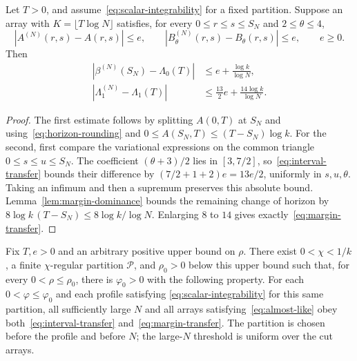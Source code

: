 \begin{lemma}\label{lem:margin-transfer}
Let $T>0$, and assume~\eqref{eq:scalar-integrability} for a fixed
partition. Suppose an array with $K=\lfloor T\log N\rfloor$ satisfies,
for every $0\le r\le s\le S_N$ and $2\le\theta\le4$,
\begin{equation}\label{eq:interval-transfer}
 |A^{(N)}(r,s)-A(r,s)|\le e,\qquad
 |B^{(N)}_\theta(r,s)-B_\theta(r,s)|\le e,
 \qquad e\ge0.
\end{equation}
Then
\begin{align}\label{eq:margin-transfer}
 |\beta^{(N)}(S_N)-\Lambda_0(T)|&\le e+\frac{\log k}{\log N},\nonumber\\
 |\Lambda_1^{(N)}-\Lambda_1(T)|&\le\frac{13}{2}e+
                                          \frac{14\log k}{\log N}.
\end{align}
\end{lemma}

\begin{proof}
The first estimate follows by splitting $A(0,T)$ at $S_N$ and
using~\eqref{eq:horizon-rounding} and
$0\le A(S_N,T)\le(T-S_N)\log k$. For the second, first compare
the variational expressions on the common triangle
$0\le s\le u\le S_N$. The coefficient $(\theta+3)/2$ lies in
$[3,7/2]$, so~\eqref{eq:interval-transfer} bounds their difference
by $(7/2+1+2)e=13e/2$, uniformly in $s,u,\theta$. Taking an
infimum and then a supremum preserves this absolute bound.
Lemma~\ref{lem:margin-dominance} bounds the remaining change of
horizon by $8\log k\,(T-S_N)\le8\log k/\log N$. Enlarging $8$
to $14$ gives exactly~\eqref{eq:margin-transfer}.
\end{proof}

\begin{proposition}\label{prop:profile-transfer}
Fix $T,e>0$ and an arbitrary positive upper bound on $\rho$.
There exist $0<\chi<1/k$, a finite $\chi$-regular partition
$\mathcal P$, and $\rho_0>0$ below this upper bound such that, for
every $0<\rho\le\rho_0$, there is $\varphi_0>0$ with the following
property. For each $0<\varphi\le\varphi_0$ and each profile satisfying
\eqref{eq:scalar-integrability} for this same partition, all
sufficiently large $N$ and all arrays satisfying~\eqref{eq:almost-like}
obey both~\eqref{eq:interval-transfer} and~\eqref{eq:margin-transfer}.
The partition is chosen before the profile and before $N$; the
large-$N$ threshold is uniform over the cut arrays.
\end{proposition}

